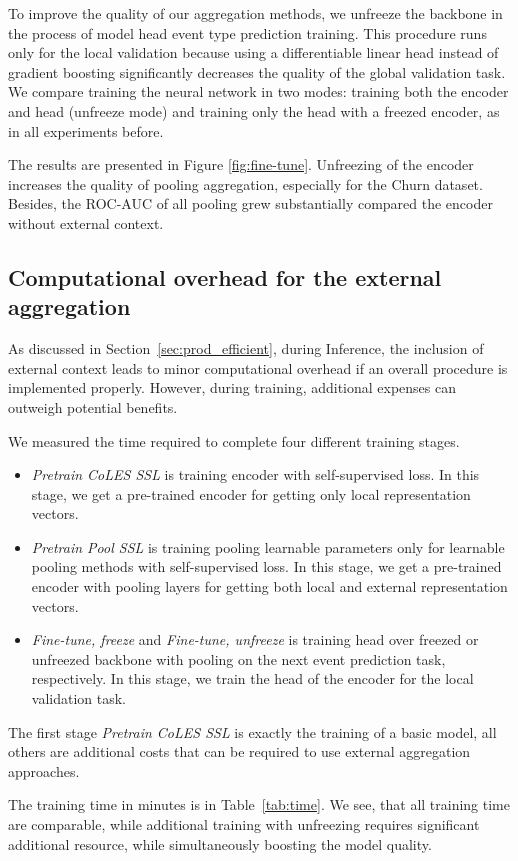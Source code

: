 To improve the quality of our aggregation methods, we unfreeze the backbone in the process of model head event type prediction training. 
This procedure runs only for the local validation because using a differentiable linear head instead of gradient boosting significantly decreases the quality of the global validation task. 
We compare training the neural network in two modes: training both the encoder and head (unfreeze mode) and training only the head with a freezed encoder, as in all experiments before. 

The results are presented in Figure \ref{fig:fine-tune}. 
Unfreezing of the encoder increases the quality of pooling aggregation, especially for the Churn dataset. 
Besides, the ROC-AUC of all pooling grew substantially compared the encoder without external context.  



\subsection{Computational overhead for the external aggregation}

As discussed in Section~\ref{sec:prod_efficient}, during Inference, the inclusion of external context leads to minor computational overhead if an overall procedure is implemented properly.
However, during training, additional expenses can outweigh potential benefits.

We measured the time required to complete four different training stages.
\begin{itemize}
    \item \textit{Pretrain CoLES SSL} is training encoder with self-supervised loss. In this stage, we get a pre-trained encoder for getting only local representation vectors.
    \item \textit{Pretrain Pool SSL} is training pooling learnable parameters only for learnable pooling methods with self-supervised loss. In this stage, we get a pre-trained encoder with pooling layers for getting both local and external representation vectors.
    \item \textit{Fine-tune, freeze} and \textit{Fine-tune, unfreeze} is training head over freezed or unfreezed backbone
 with pooling on the next event prediction task, respectively. In this stage, we train the head of the encoder for the local validation task.
\end{itemize}
The first stage \textit{Pretrain CoLES SSL} is exactly the training of a basic model, all others are additional costs that can be required to use external aggregation approaches.

The training time in minutes is in Table~\ref{tab:time}.
We see, that all training time are comparable, while additional training with unfreezing requires significant additional resource, while simultaneously boosting the model quality.



